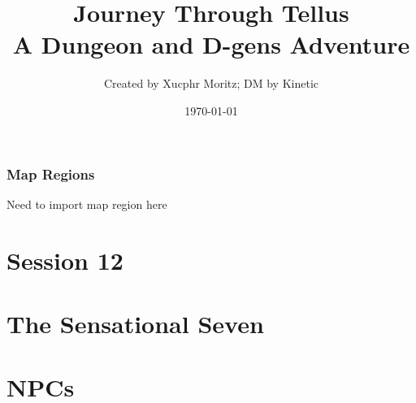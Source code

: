\documentclass[letterpaper,twocolumn,openany,nodeprecatedcode]{dndbook}
\title{Journey Through Tellus \\
\large A Dungeon and D-gens Adventure}
\author{Created by Xucphr Moritz; DM by Kinetic}
\date{\today}
\begin{document}
\frontmatter

\maketitle

\tableofcontents

\mainmatter%



\section{Map Regions}

Need to import map region here






\part*{Session 12}


%

\part{The Sensational Seven}





\part{NPCs}



%
\end{document}
